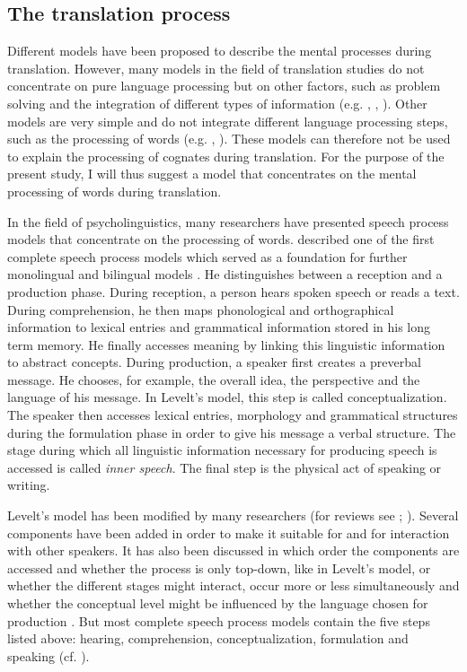 \documentclass[output=paper]{LSP/langsci}
\begin{document}
\subsection{The translation process}\label{oster:sec:1.2}
Different models have been proposed to describe the mental processes during translation. However, many models in the field of translation studies do not concentrate on pure language processing but on other factors, such as problem solving and the integration of different types of information (e.g. \citealt{Honig1997}, \citealt{Kiraly1995Pathways}, \citealt{Krings1986Was}). Other models are very simple and do not integrate different language processing steps, such as the processing of words (e.g. \citealt{Kautz2000}, \citealt{Steiner2001Translations}). These models can therefore not be used to explain the processing of cognates during translation. For the purpose of the present study, I will thus suggest a model that concentrates on the mental processing of words during translation.

In the field of psycholinguistics, many researchers have presented speech process models that concentrate on the processing of words. \citet{Levelt1989} described one of the first complete speech process models which served as a foundation for further monolingual and bilingual models \citep{DeGroot2011}. He distinguishes between a reception and a production phase. During reception, a person hears spoken speech or reads a text. During comprehension, he then maps phonological and orthographical information to lexical entries and grammatical information stored in his long term memory. He finally accesses meaning by linking this linguistic information to abstract concepts. During production, a speaker first creates a preverbal message. He chooses, for example, the overall idea, the perspective and the language of his message. In Levelt's model, this step is called conceptualization. The speaker then accesses lexical entries, morphology and grammatical structures during the formulation phase in order to give his message a verbal structure. The stage during which all linguistic information necessary for producing speech is accessed is called \textit{inner speech}. The final step is the physical act of speaking or writing.

Levelt's model has been modified by many researchers (for reviews see \citealt{DeGroot2011}; \citealt{Plieger2006}). Several components have been added in order to make it suitable for  and for interaction with other speakers. It has also been discussed in which order the components are accessed and whether the process is only top-down, like in Levelt's model, or whether the different stages might interact, occur more or less simultaneously and whether the conceptual level might be influenced by the language chosen for production \citep{Dell1992}. But most complete speech process models contain the five steps listed above: hearing, comprehension, conceptualization, formulation and speaking (cf. \citealt{Plieger2006}).
\end{document}

